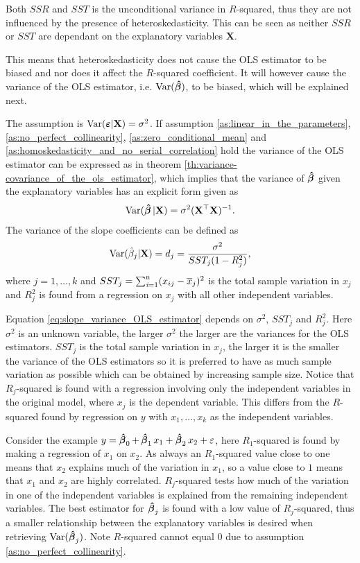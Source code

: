Both $SSR$ and $SST$ is the unconditional variance in $R$-squared, thus they are not influenced by the presence of heteroskedasticity. This can be seen as neither $SSR$ or $SST$ are dependant on the explanatory variables $\textbf{X}$.

This means that heteroskedasticity does not cause the OLS estimator to be biased and nor does it affect the $R$-squared coefficient. 
It will however cause the variance of the OLS estimator, i.e. $\operatorname{\text{Var}}(\operatorname{\boldsymbol{\hat{\beta}}})$, to be biased, which will be explained next.  

The \homo assumption is $\operatorname{\text{Var}}(\boldsymbol{\varepsilon} | \mathbf{X}) = \sigma^2$. If assumption \ref{as:linear_in_the_parameters}, \ref{as:no_perfect_collinearity}, \ref{as:zero_conditional_mean} and \ref{as:homoskedasticity_and_no_serial_correlation} hold the variance of the OLS estimator can be expressed as in theorem \ref{th:variance-covariance_of_the_ols_estimator}, which implies that the variance of $\operatorname{\boldsymbol{\hat{\beta}}}$ given the explanatory variables has an explicit form given as
\begin{align*}
    \operatorname{\text{Var}}(\operatorname{\boldsymbol{\hat{\beta}}} | \mathbf{X}) = \sigma^2(\mathbf{X}^\top\mathbf{X})^{-1}.
\end{align*}
The variance of the slope coefficients can be defined as
\begin{align}\label{eq:slope_variance_OLS_estimator}
    \operatorname{\text{Var}}(\hat{\beta}_j|\mathbf{X}) = d_j = \dfrac{\sigma^2}{SST_j(1- R_j^2)},
\end{align}
where $j = 1, \ldots, k$ and $SST_j = \operatorname{\sum_{\textit{i}=1}^n} (x_{ij} - \overline{x}_j)^2$ is the total sample variation in $x_j$ and $R^2_j$ is found from a regression on $x_j$ with all other independent variables. 

Equation \eqref{eq:slope_variance_OLS_estimator} depends on $\sigma^2$, $SST_j$ and $R^2_j$.
Here $\sigma^2$ is an unknown variable, the larger $\sigma^2$ the larger are the variances for the OLS estimators. $SST_j$ is the total sample variation in $x_j$, the larger it is the smaller the variance of the OLS estimators so it is preferred to have as much sample variation as possible which can be obtained by increasing sample size. 
Notice that $R_j$-squared is found with a regression involving only the independent variables in the original model, where $x_j$ is the dependent variable. 
This differs from the $R$-squared found by regression on $y$ with $x_1, \ldots, x_k$ as the independent variables. 

Consider the example $y = \operatorname{\boldsymbol{\hat{\beta}}}_0 + \operatorname{\boldsymbol{\hat{\beta}}}_1 x_1 + \operatorname{\boldsymbol{\hat{\beta}}}_2 x_2 + \varepsilon$, here $R_1$-squared is found by making a regression of $x_1$ on $x_2$. 
As always an $R_1$-squared value close to one means that $x_2$ explains much of the variation in $x_1$, so a value close to $1$ means that $x_1$ and $x_2$ are highly correlated.
$R_j$-squared tests how much of the variation in one of the independent variables is explained from the remaining independent variables.
The best estimator for $\operatorname{\boldsymbol{\hat{\beta}}}_j$ is found with a low value of $R_j$-squared, thus a smaller relationship between the explanatory variables is desired when retrieving $\operatorname{\text{Var}}(\operatorname{\boldsymbol{\hat{\beta}}}_j)$. Note $R$-squared cannot equal $0$ due to assumption \ref{as:no_perfect_collinearity}. 

